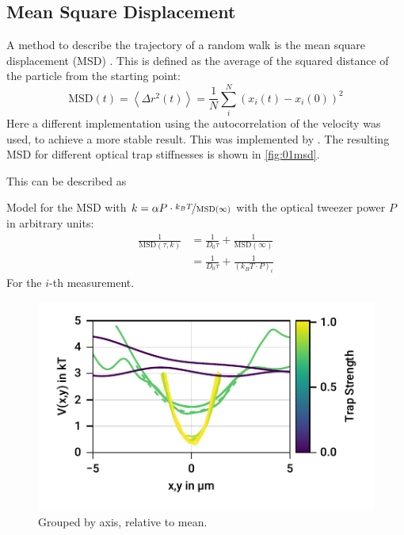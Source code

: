 \documentclass[
    parskip=half, 
    twoside=false,
    twocolumn=true,
    fontsize=11pt,
]{scrarticle}
\begin{document}
\subsection*{Mean Square Displacement}
A method to describe the trajectory of a random walk is the mean square displacement (MSD) \cite{wiki:msd}.
This is defined as the average of the squared distance of the particle from the starting point:
\begin{equation}
    \text{MSD}(t) = \left<\Delta r^2(t)\right> = \frac{1}{N} \sum_i^N \left(x_i(t) - x_i(0) \right)^2 
\end{equation}
Here a different implementation using the autocorrelation of the velocity was used, to achieve a more stable result.
This was implemented by \cite{jl:msd}.
The resulting MSD for different optical trap stiffnesses is shown in \autoref{fig:01msd}.

This can be described as 

Model for the MSD with $k=\alpha P \cdot\nicefrac{k_B T}{\text{MSD}(\infty)}$ with the optical tweezer power $P$ in arbitrary units:
\begin{align}
    \frac{1}{\text{MSD}(\tau, k)}
    &= \frac{1}{D_0 \tau} + \frac{1}{\text{MSD}(\infty)}\\
    &= \frac{1}{D_0 \tau} + \frac{1}{(k_B T \cdot P)_i}
    \label{eq:01_mdl_msd} 
\end{align}
For the $i$-th measurement.


\begin{figure}
    \centering
    \includegraphics{figures/01_03_3_axis.pdf}
    \caption{Grouped by axis, relative to mean.}
\end{figure}
\end{document}
